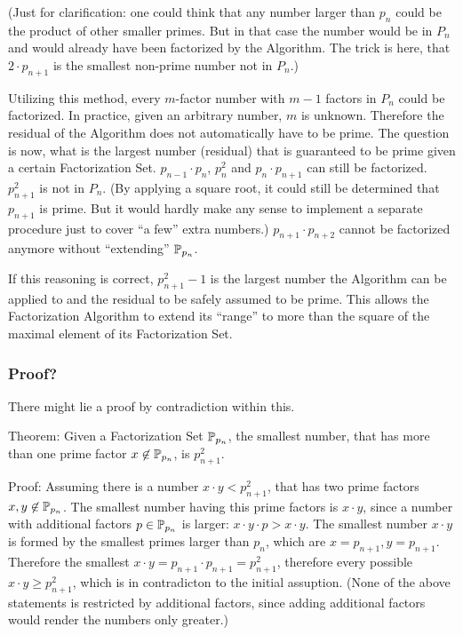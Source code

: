 \documentclass[a4paper,10pt]{article}
\begin{document}
(Just for clarification: one could think that any number larger than $p_n$ could
be the product of other smaller primes.
But in that case the number would be in $P_n$ and would already have been factorized
by the Algorithm.
The trick is here, that $2 \cdot p_{n+1}$ is the smallest non-prime number not in $P_n$.)

Utilizing this method, every $m$-factor number with $m-1$ factors in $P_n$ could
be factorized.
In practice, given an arbitrary number, $m$ is unknown.
Therefore the residual of the Algorithm does not automatically have to be prime.
The question is now, what is the largest number (residual) that is guaranteed to be prime
given a certain Factorization Set.
$p_{n-1} \cdot p_n$, $p_n^2$ and $p_n \cdot p_{n+1}$ can still be factorized.
$p_{n+1}^2$ is not in $P_n$.
(By applying a square root, it could still be determined that $p_{n+1}$ is prime.
But it would hardly make any sense to implement a separate procedure just to cover
``a few'' extra numbers.)
$p_{n+1} \cdot p_{n+2}$ cannot be factorized anymore without ``extending'' $\mathbb{P}_{p_n}$.

If this reasoning is correct, $p_{n+1}^2 - 1$ is the largest number
the Algorithm can be applied to and the residual to be safely assumed to be prime.
This allows the Factorization Algorithm to extend its ``range'' to more than the
square of the maximal element of its Factorization Set.

\subsubsection*{Proof?}


There might lie a proof by contradiction within this.

Theorem:
Given a Factorization Set $\mathbb{P}_{p_n}$,
the smallest number,
that has more than one prime factor $x \not\in \mathbb{P}_{p_n}$,
is $p_{n+1}^2$.

Proof:
Assuming there is a number $x \cdot y < p_{n+1}^2$,
that has two prime factors $x, y \not\in \mathbb{P}_{p_n}$.
The smallest number having this prime factors is $x \cdot y$,
since a number with additional factors $p \in \mathbb{P}_{p_n}$ is larger:
$x \cdot y \cdot p > x \cdot y$.
The smallest number $x \cdot y$ is formed by the smallest primes larger than $p_n$,
which are $x = p_{n+1}, y = p_{n+1}$.
Therefore the smallest $x \cdot y = p_{n+1} \cdot p_{n+1} = p_{n+1}^2$,
therefore every possible $x \cdot y \geq p_{n+1}^2$,
which is in contradicton to the initial assuption.
(None of the above statements is restricted by additional factors,
since adding additional factors would render the numbers only greater.)

\rightline{$\square$}
\end{document}
